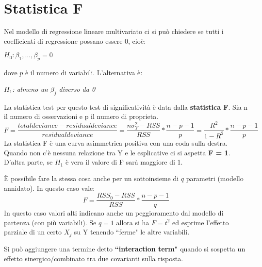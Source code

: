 \section{Statistica F}
Nel modello di regressione lineare multivariato ci si può chiedere se tutti i coefficienti di regressione possano essere 0, cioè:
\begin{center}
	$H_{0}: \beta_{1}, \dots, \beta_{p} = 0$
\end{center}
dove $p$ \`e il numero di variabili. L'alternativa \`e:
\begin{center}
	$H_{1}$\textit{: almeno un $\beta_{j}$ diverso da 0}
\end{center}
La statistica-test per questo test di significativit\`a \`e data dalla \textbf{statistica F}. Sia n il numero di osservazioni e p il numero di proprieta.
\[ F = \frac{total deviance - residual deviance}{residual deviance} = \frac{n\sigma^2_{Y} - RSS}{RSS} * \frac{n - p - 1}{p} = \frac{R^{2}}{1 - R^{2}} * \frac{n - p - 1}{p} \]
La statistica F è una curva asimmetrica positiva con una coda sulla destra.
Quando non c'\`e nessuna relazione tra Y e le esplicative ci si aspetta \textbf{F = 1}. D'altra parte, se $H_{1}$ è vera il valore di F sar\`a maggiore di 1.

È possibile fare la stessa cosa anche per un sottoinsieme di $q$ parametri (modello annidato). In questo caso vale:
\[ F = \frac{RSS_{0} - RSS}{RSS} * \frac{n - p - 1}{q} \]
In questo caso valori alti indicano anche un peggioramento dal modello di partenza (con più variabili). Se $q = 1$ allora si ha $F=t^{2}$ ed esprime l'effetto parziale di un certo $X_{j}$ su Y tenendo ``ferme" le altre variabili.

Si può aggiungere una termine detto \textbf{``interaction term"} quando si sospetta un effetto sinergico/combinato tra due covarianti sulla risposta.
